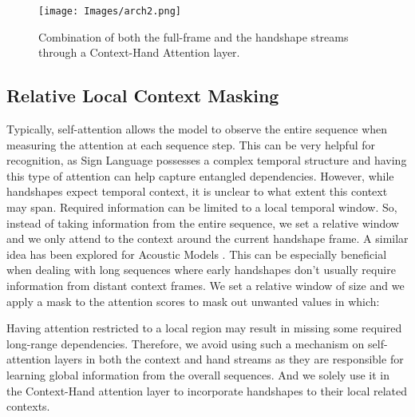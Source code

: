 \documentclass[a4paper,conference]{IEEEtran}
\begin{document}
\begin{figure*}[t]
 \centering
 \texttt{[image: Images/arch2.png]}
 \caption{Combination of both the full-frame and the handshape streams through a Context-Hand Attention layer.}
\label{fig:2}
\end{figure*}


\subsection{Relative Local Context Masking}
	
Typically, self-attention allows the model to observe the entire sequence when measuring the attention at each sequence step. This can be very helpful for recognition, as Sign Language possesses a complex temporal structure and having this type of attention can help capture entangled dependencies. However, while handshapes expect temporal context, it is unclear to what extent this context may span. Required information can be limited to a local temporal window. So, instead of taking information from the entire sequence, we set a relative window and we only attend to the context around the current handshape frame. A similar idea has been explored for Acoustic Models \cite{sperber2018self}. This can be especially beneficial when dealing with long sequences where early handshapes don't usually require information from distant context frames.  We set a relative window of size  and we apply a mask  to the attention scores to mask out unwanted values in which:
    

	
Having attention restricted to a local region may result in missing some required long-range dependencies. Therefore, we avoid using such a mechanism on self-attention layers in both the context and hand streams as they are responsible for learning global information from the overall sequences. And we solely use it in the Context-Hand attention layer to incorporate handshapes to their local related contexts. 
\end{document}
